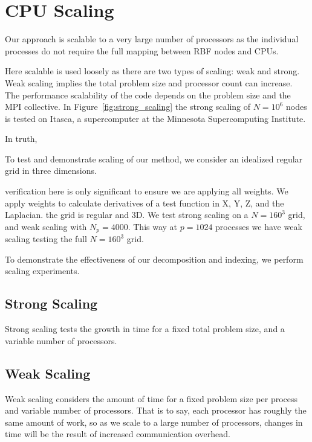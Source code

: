 \documentclass{report}
\begin{document}
\section{CPU Scaling}

      Our approach is scalable to a very large number of 
		processors as the individual processes do not require the 
		full mapping between RBF nodes and CPUs. 
		
Here scalable is used loosely as there are two types of scaling: weak and strong. Weak scaling implies the total problem size and processor count can increase. The performance scalability of the code depends on the problem size and the MPI collective. In Figure~\ref{fig:strong_scaling} the strong scaling of $N=10^6$ nodes is tested on Itasca, a supercomputer at the Minnesota Supercomputing Institute.   

In truth, %



To test and demonstrate scaling of our method, we consider an idealized regular grid in three dimensions. 

verification here is only significant to ensure we are applying all weights. 
We apply weights to calculate derivatives of a test function in X, Y, Z, and the Laplacian. 
the grid is regular and 3D.
We test strong scaling on a $N=160^3$ grid, and weak scaling with $N_p=4000$. This way at $p=1024$ processes we have weak scaling testing the full $N=160^3$ grid. 



To demonstrate the effectiveness of our decomposition and indexing, we perform scaling experiments. 

\subsection{Strong Scaling}
Strong scaling tests the growth in time for a fixed total problem size, and a variable number of processors. 

\subsection{Weak Scaling}
Weak scaling considers the amount of time for a fixed problem size per process and variable number of processors. That is to say, each processor has roughly the same amount of work, so as we scale to a large number of processors, changes in time will be the result of increased communication overhead. 
\end{document}
